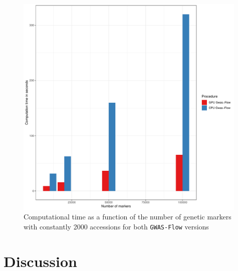 \begin{figure}[H]
\centering
\includegraphics[height=.55\textheight, width=0.99\textwidth]{Figures/time_markers_gwas}
\decoRule
\caption[Computation time vs number of markers]{Computational time as a function of the number of genetic markers with constantly 2000 accessions for both \texttt{GWAS-Flow} versions}
\label{fig:time_marker}
\end{figure}

\section{Discussion}

